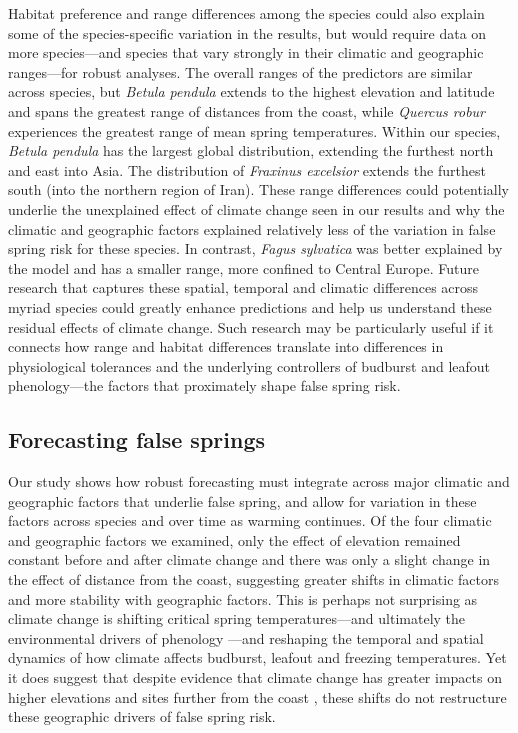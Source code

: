 \documentclass{article}\usepackage[]{graphicx}\usepackage[]{color}
\begin{document}
Habitat preference and range differences among the species could also explain some of the species-specific variation in the results, but would require data on more species---and species that vary strongly in their climatic and geographic ranges---for robust analyses. The overall ranges of the predictors are similar across species, but \textit{Betula pendula} extends to the highest elevation and latitude and spans the greatest range of distances from the coast, while \textit{Quercus robur} experiences the greatest range of mean spring temperatures. Within our species, \textit{Betula pendula} has the largest global distribution, extending the furthest north and east into Asia. The distribution of \textit{Fraxinus excelsior} extends the furthest south (into the northern region of Iran). These range differences could potentially underlie the unexplained effect of climate change seen in our results and why the climatic and geographic factors explained relatively less of the variation in false spring risk for these species. In contrast, \textit{Fagus sylvatica} was better explained by the model and has a smaller range, more confined to Central Europe. Future research that captures these spatial, temporal and climatic differences across myriad species could greatly enhance predictions and help us understand these residual effects of climate change. Such research may be particularly useful if it connects how range and habitat differences translate into differences in physiological tolerances and the underlying controllers of budburst and leafout phenology---the factors that proximately shape false spring risk. %


\subsection*{Forecasting false springs}
Our study shows how robust forecasting must integrate across major climatic and geographic factors that underlie false spring, and allow for variation in these factors across species and over time as warming continues. Of the four climatic and geographic factors we examined, only the effect of elevation remained constant before and after climate change and there was only a slight change in the effect of distance from the coast, suggesting greater shifts in climatic factors and more stability with geographic factors. This is perhaps not surprising as climate change is shifting critical spring temperatures---and ultimately the environmental drivers of phenology \citep{Gauzere2019}---and reshaping the temporal and spatial dynamics of how climate affects budburst, leafout and freezing temperatures.  Yet it does suggest that despite evidence that climate change has greater impacts on higher elevations and sites further from the coast \citep{Pepin2015, Rangwala2012, Giorgi1997,Vitasse2018}, these shifts do not restructure these geographic drivers of false spring risk.  
\end{document}
